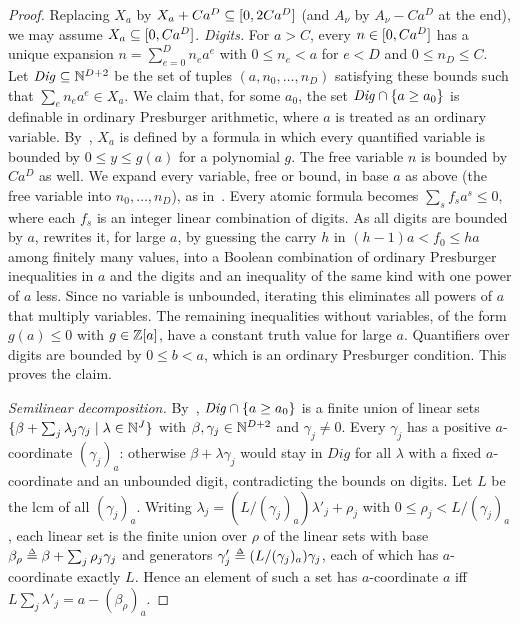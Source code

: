 \begin{proof}
    Replacing $X_a$ by $X_a + C a^{D} \subseteq [0, 2 C a^{D}]$ (and $A_\nu$ by $A_\nu - C a^{D}$ at the end), we may assume $X_a \subseteq [0, C a^{D}]$.
    \emph{Digits.}
    For $a > C$, every $n \in [0, C a^{D}]$ has a unique expansion $n = \sum_{e = 0}^{D} n_e a^{e}$ with $0 \le n_e < a$ for $e < D$ and $0 \le n_D \le C$.
    Let $\mathit{Dig} \subseteq \mathbb{N}^{D + 2}$ be the set of tuples $(a, n_0, \dots, n_D)$ satisfying these bounds such that $\sum_{e} n_e a^{e} \in X_a$.
    We claim that, for some $a_0$, the set $\mathit{Dig} \cap \{a \ge a_0\}$ is definable in ordinary Presburger arithmetic, where $a$ is treated as an ordinary variable.
    By~\cite[Thm.~3.7]{bogartParametricPresburgerArithmetic2017}, $X_a$ is defined by a formula in which every quantified variable is bounded by $0 \le y \le g(a)$ for a polynomial $g$.
    The free variable $n$ is bounded by $C a^{D}$ as well.
    We expand every variable, free or bound, in base $a$ as above (the free variable into $n_0, \dots, n_D$), as in~\cite[Lemma~4.5]{bogartParametricPresburgerArithmetic2017}.
    Every atomic formula becomes $\sum_{s} f_s a^{s} \le 0$, where each $f_s$ is an integer linear combination of digits.
    As all digits are bounded by $a$, \cite[Lemma~4.6]{bogartParametricPresburgerArithmetic2017} rewrites it, for large $a$, by guessing the carry $h$ in $(h-1) a < f_0 \le h a$ among finitely many values,
    into a Boolean combination of ordinary Presburger inequalities in $a$ and the digits and an inequality of the same kind with one power of $a$ less.
    Since no variable is unbounded, iterating this eliminates all powers of $a$ that multiply variables.
    The remaining inequalities without variables, of the form $g(a) \le 0$ with $g \in \mathbb{Z}[a]$, have a constant truth value for large $a$.
    Quantifiers over digits are bounded by $0 \le b < a$, which is an ordinary Presburger condition.
    This proves the claim.

    \emph{Semilinear decomposition.}
    By~\cite{ginsburgSemigroupsPresburgerFormulas1966}, $\mathit{Dig} \cap \{a \ge a_0\}$ is a finite union of linear sets $\{\beta + \sum_{j} \lambda_j \gamma_j \mid \lambda \in \mathbb{N}^{J}\}$ with $\beta, \gamma_j \in \mathbb{N}^{D + 2}$ and $\gamma_j \ne 0$.
    Every $\gamma_j$ has a positive $a$-coordinate $(\gamma_j)_a$:
    otherwise $\beta + \lambda \gamma_j$ would stay in $\mathit{Dig}$ for all $\lambda$ with a fixed $a$-coordinate and an unbounded digit, contradicting the bounds on digits.
    Let $L$ be the lcm of all $(\gamma_j)_{a}$.
    Writing $\lambda_j = (L / (\gamma_j)_a) \lambda'_j + \rho_j$ with $0 \le \rho_j < L / (\gamma_j)_a$, each linear set is the finite union over $\rho$ of the linear sets with base $\beta_\rho \defeq \beta + \sum_{j} \rho_j \gamma_j$ and generators $\gamma'_j \defeq (L / (\gamma_j)_{a}) \gamma_j$, each of which has $a$-coordinate exactly $L$.
    Hence an element of such a set has $a$-coordinate $a$ iff $L \sum_j \lambda'_j = a - (\beta_\rho)_{a}$.


\end{proof}
